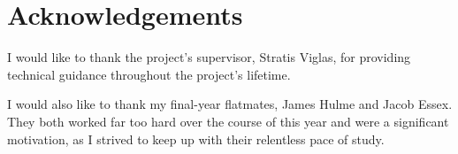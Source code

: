 \documentclass[bsc,frontabs,twoside,singlespacing,parskip]{infthesis}
\begin{document}

\abstract{}
\maketitle

\section*{Acknowledgements}
I would like to thank the project's supervisor, Stratis Viglas, for providing technical guidance throughout the project's lifetime.

I would also like to thank my final-year flatmates, James Hulme and Jacob Essex. They both worked far too hard over the course of this year and were a significant motivation, as I strived to keep up with their relentless pace of study.

\tableofcontents
\listoftodos

\raggedbottom

\newpage
{}














{}

\end{document}

